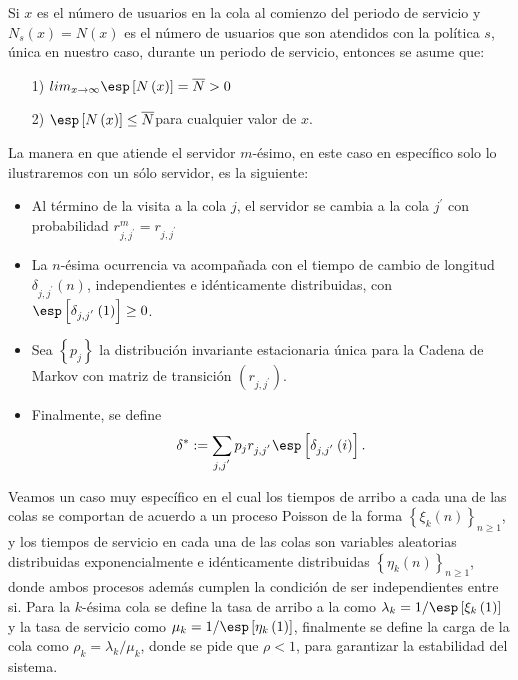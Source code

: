 Si $x$ es el n\'umero de usuarios en la cola al comienzo del
periodo de servicio y $N_{s}\left(x\right)=N\left(x\right)$ es el
n\'umero de usuarios que son atendidos con la pol\'itica $s$,
\'unica en nuestro caso, durante un periodo de servicio, entonces
se asume que:
\begin{itemize}
\item[1)]\label{S1}$lim_{x\rightarrow\infty}\esp\left[N\left(x\right)\right]=\overline{N}>0$
\item[2)]\label{S2}$\esp\left[N\left(x\right)\right]\leq\overline{N}$para
cualquier valor de $x$.
\end{itemize}
La manera en que atiende el servidor $m$-\'esimo, en este caso en
espec\'ifico solo lo ilustraremos con un s\'olo servidor, es la
siguiente:
\begin{itemize}
\item Al t\'ermino de la visita a la cola $j$, el servidor se
cambia a la cola $j^{'}$ con probabilidad
$r_{j,j^{'}}^{m}=r_{j,j^{'}}$

\item La $n$-\'esima ocurrencia va acompa\~nada con el tiempo de
cambio de longitud $\delta_{j,j^{'}}\left(n\right)$,
independientes e id\'enticamente distribuidas, con
$\esp\left[\delta_{j,j^{'}}\left(1\right)\right]\geq0$.

\item Sea $\left\{p_{j}\right\}$ la distribuci\'on invariante
estacionaria \'unica para la Cadena de Markov con matriz de
transici\'on $\left(r_{j,j^{'}}\right)$.

\item Finalmente, se define
\begin{equation}
\delta^{*}:=\sum_{j,j^{'}}p_{j}r_{j,j^{'}}\esp\left[\delta_{j,j^{'}}\left(i\right)\right].
\end{equation}
\end{itemize}

Veamos un caso muy espec\'ifico en el cual los tiempos de arribo a cada una de las colas se comportan de acuerdo a un proceso Poisson de la forma
$\left\{\xi_{k}\left(n\right)\right\}_{n\geq1}$, y los tiempos de servicio en cada una de las colas son variables aleatorias distribuidas exponencialmente e id\'enticamente distribuidas
$\left\{\eta_{k}\left(n\right)\right\}_{n\geq1}$, donde ambos procesos adem\'as cumplen la condici\'on de ser independientes entre si. Para la $k$-\'esima cola se define la tasa de arribo a la como
$\lambda_{k}=1/\esp\left[\xi_{k}\left(1\right)\right]$ y la tasa
de servicio como
$\mu_{k}=1/\esp\left[\eta_{k}\left(1\right)\right]$, finalmente se
define la carga de la cola como $\rho_{k}=\lambda_{k}/\mu_{k}$,
donde se pide que $\rho<1$, para garantizar la estabilidad del sistema.\\

